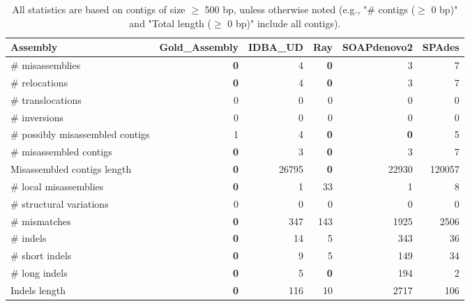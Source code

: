 \documentclass[12pt,a4paper]{article}
\begin{document}
\begin{table}[ht]
\begin{center}
\caption{All statistics are based on contigs of size $\geq$ 500 bp, unless otherwise noted (e.g., "\# contigs ($\geq$ 0 bp)" and "Total length ($\geq$ 0 bp)" include all contigs).}
\begin{tabular}{|l*{5}{|r}|}
\hline
Assembly & Gold\_Assembly & IDBA\_UD & Ray & SOAPdenovo2 & SPAdes \\ \hline
\# misassemblies & {\bf 0} & 4 & {\bf 0} & 3 & 7 \\ \hline
\hspace{5mm}\# relocations & {\bf 0} & 4 & {\bf 0} & 3 & 7 \\ \hline
\hspace{5mm}\# translocations & 0 & 0 & 0 & 0 & 0 \\ \hline
\hspace{5mm}\# inversions & 0 & 0 & 0 & 0 & 0 \\ \hline
\# possibly misassembled contigs & 1 & 4 & {\bf 0} & {\bf 0} & 5 \\ \hline
\# misassembled contigs & {\bf 0} & 3 & {\bf 0} & 3 & 7 \\ \hline
Misassembled contigs length & {\bf 0} & 26795 & {\bf 0} & 22930 & 120057 \\ \hline
\# local misassemblies & {\bf 0} & 1 & 33 & 1 & 8 \\ \hline
\# structural variations & 0 & 0 & 0 & 0 & 0 \\ \hline
\# mismatches & {\bf 0} & 347 & 143 & 1925 & 2506 \\ \hline
\# indels & {\bf 0} & 14 & 5 & 343 & 36 \\ \hline
\hspace{5mm}\# short indels & {\bf 0} & 9 & 5 & 149 & 34 \\ \hline
\hspace{5mm}\# long indels & {\bf 0} & 5 & {\bf 0} & 194 & 2 \\ \hline
Indels length & {\bf 0} & 116 & 10 & 2717 & 106 \\ \hline
\end{tabular}
\end{center}
\end{table}
\end{document}
